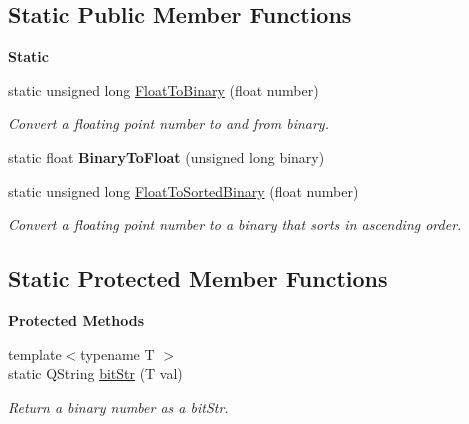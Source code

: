 \subsection*{Static Public Member Functions}
\begin{Indent}\textbf{ Static}\par
\begin{DoxyCompactItemize}
\item 
\mbox{\label{classrev_1_1_sort_key_a25e167f30dcddb31106f5c756a090d58}} 
static unsigned long \mbox{\hyperlink{classrev_1_1_sort_key_a25e167f30dcddb31106f5c756a090d58}{Float\+To\+Binary}} (float number)
\begin{DoxyCompactList}\small\item\em Convert a floating point number to and from binary. \end{DoxyCompactList}\item 
\mbox{\label{classrev_1_1_sort_key_ad44d4a0fbf6e5263658d09b97ec85cae}} 
static float {\bfseries Binary\+To\+Float} (unsigned long binary)
\item 
\mbox{\label{classrev_1_1_sort_key_a0aa99cec2abed8c2e6cbba87b7ed69ce}} 
static unsigned long \mbox{\hyperlink{classrev_1_1_sort_key_a0aa99cec2abed8c2e6cbba87b7ed69ce}{Float\+To\+Sorted\+Binary}} (float number)
\begin{DoxyCompactList}\small\item\em Convert a floating point number to a binary that sorts in ascending order. \end{DoxyCompactList}\end{DoxyCompactItemize}
\end{Indent}
\subsection*{Static Protected Member Functions}
\begin{Indent}\textbf{ Protected Methods}\par
\begin{DoxyCompactItemize}
\item 
\mbox{\label{classrev_1_1_sort_key_ab0a5568d79fc0c38a0ec19562877a8a9}} 
{\footnotesize template$<$typename T $>$ }\\static Q\+String \mbox{\hyperlink{classrev_1_1_sort_key_ab0a5568d79fc0c38a0ec19562877a8a9}{bit\+Str}} (T val)
\begin{DoxyCompactList}\small\item\em Return a binary number as a bit\+Str. \end{DoxyCompactList}\end{DoxyCompactItemize}
\end{Indent}
